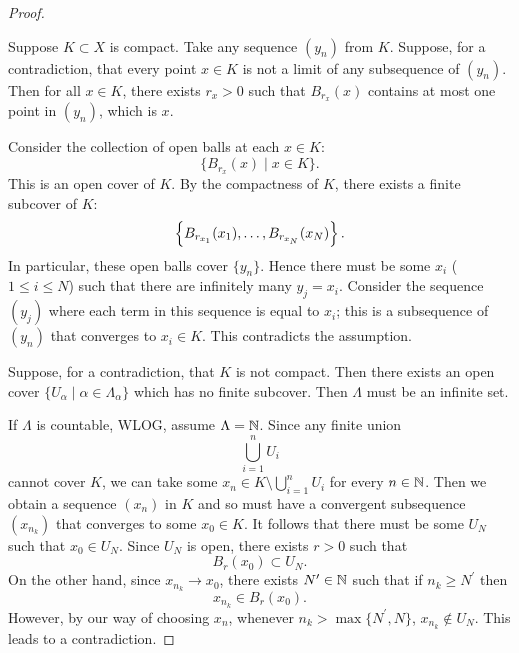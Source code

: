 \begin{proof} \

\fbox{$\implies$} Suppose $K\subset X$ is compact. Take any sequence $(y_n)$ from $K$. Suppose, for a contradiction, that every point $x\in K$ is not a limit of any subsequence of $(y_n)$. Then for all $x\in K$, there exists $r_x>0$ such that $B_{r_x}(x)$ contains at most one point in $(y_n)$, which is $x$.

Consider the collection of open balls at each $x\in K$:
\[\{B_{r_x}(x)\mid x\in K\}.\]
This is an open cover of $K$. By the compactness of $K$, there exists a finite subcover of $K$:
\[\left\{B_{r_{x_1}}(x_1),\dots,B_{r_{x_N}}(x_N)\right\}.\]
In particular, these open balls cover $\{y_n\}$. Hence there must be some $x_i$ ($1\le i\le N$) such that there are infinitely many $y_j=x_i$. Consider the sequence $(y_j)$ where each term in this sequence is equal to $x_i$; this is a subsequence of $(y_n)$ that converges to $x_i\in K$. This contradicts the assumption.

\fbox{$\impliedby$} Suppose, for a contradiction, that $K$ is not compact. Then there exists an open cover $\{U_\alpha\mid \alpha\in \Lambda_\alpha\}$ which has no finite subcover. Then $\Lambda$ must be an infinite set.

If $\Lambda$ is countable, WLOG, assume $\Lambda=\mathbb N$. Since any finite union
\[\bigcup_{i=1}^{n}U_i\]
cannot cover $K$, we can take some $x_n\in K\setminus\bigcup_{i=1}^{n}U_i$ for every $n\in\mathbb N$. Then we obtain a sequence $(x_n)$ in $K$ and so must have a convergent subsequence $(x_{n_k})$ that converges to some $x_0\in K$. It follows that there must be some $U_N$ such that $x_0\in U_N$. Since $U_N$ is open, there exists $r>0$ such that 
\[B_r(x_0)\subset U_N.\]
On the other hand, since $x_{n_k}\to x_0$, there exists $N^\prime\in\mathbb N$ such that if $n_k\ge N^\prime$ then
\[x_{n_k}\in B_r(x_0).\]
However, by our way of choosing $x_n$, whenever $n_k>\max\{N^\prime,N\}$, $x_{n_k}\notin U_N$. This leads to a contradiction.
\end{proof}

\begin{comment}
sequential compactness
A set $K$ is compact if and only if every sequence of points in $K$ has a subsequence that converges to a point in $K$.

Any continuous function defined on a compact set is bounded.

extreme value theorem
\end{comment}
\pagebreak

